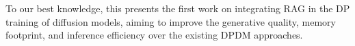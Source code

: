 
To our best knowledge, this presents the first work on integrating RAG in the DP training of diffusion models, aiming to improve the generative quality, memory footprint, and inference efficiency over the existing DPDM approaches. 


